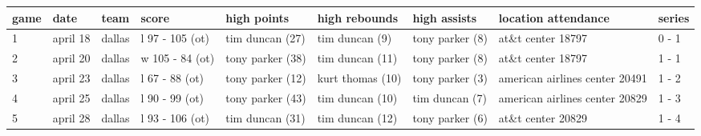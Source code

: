 \documentclass{article}
\begin{document}
\begin{tabular}{lllllllll}
\toprule
game & date & team & score & high points & high rebounds & high assists & location attendance & series \\
\midrule
1 & april 18 & dallas & l 97 - 105 (ot) & tim duncan (27) & tim duncan (9) & tony parker (8) & at\&t center 18797 & 0 - 1 \\
2 & april 20 & dallas & w 105 - 84 (ot) & tony parker (38) & tim duncan (11) & tony parker (8) & at\&t center 18797 & 1 - 1 \\
3 & april 23 & dallas & l 67 - 88 (ot) & tony parker (12) & kurt thomas (10) & tony parker (3) & american airlines center 20491 & 1 - 2 \\
4 & april 25 & dallas & l 90 - 99 (ot) & tony parker (43) & tim duncan (10) & tim duncan (7) & american airlines center 20829 & 1 - 3 \\
5 & april 28 & dallas & l 93 - 106 (ot) & tim duncan (31) & tim duncan (12) & tony parker (6) & at\&t center 20829 & 1 - 4 \\
\bottomrule
\end{tabular}
\end{document}
